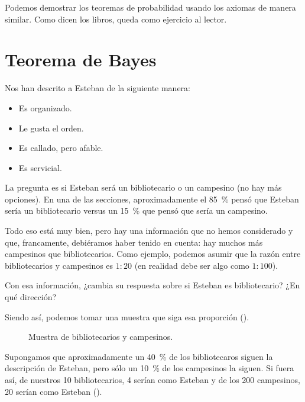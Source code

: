 Podemos demostrar los teoremas de probabilidad usando los axiomas de manera similar. Como dicen los libros, queda como ejercicio al lector.

\section{Teorema de Bayes}

Nos han descrito a Esteban de la siguiente manera:
\begin{itemize}
\item Es organizado.
\item Le gusta el orden.
\item Es callado, pero afable.
\item Es servicial.
\end{itemize}

La pregunta es si Esteban será un bibliotecario o un campesino (no hay más opciones). En una de las secciones, aproximadamente el \qty{85}{\percent} pensó que Esteban sería un bibliotecario versus un \qty{15}{\percent} que pensó que sería un campesino.

Todo eso está muy bien, pero hay una información que no hemos considerado y que, francamente, debiéramos haber tenido en cuenta: hay muchos más campesinos que bibliotecarios. Como ejemplo, podemos asumir que la razón entre bibliotecarios y campesinos es \(1:20\) (en realidad debe ser algo como \(1:100\)).

\begin{pausa}
Con esa información, ¿cambia su respuesta sobre si Esteban es bibliotecario? ¿En qué dirección?
\end{pausa}

Siendo así, podemos tomar una muestra que siga esa proporción (). 

\begin{figure}
    \caption{Muestra de bibliotecarios y campesinos.}
\end{figure}

Supongamos que aproximadamente un \qty{40}{\percent} de los bibliotecaros siguen la descripción de Esteban, pero sólo un \qty{10}{\percent} de los campesinos la siguen. Si fuera así, de nuestros 10 bibliotecarios, 4 serían como Esteban y de los 200 campesinos, 20 serían como Esteban ().

